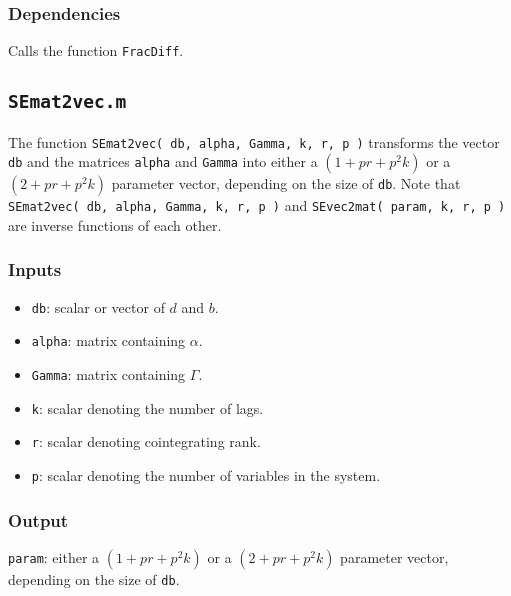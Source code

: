 \documentclass[12pt]{article}
\begin{document}
\subsubsection*{Dependencies}

Calls the function \texttt{FracDiff}.




\newpage


\subsection{\texttt{SEmat2vec.m}}

The function \texttt{SEmat2vec( db, alpha, Gamma, k, r, p )} transforms the vector \texttt{db} and the matrices \texttt{alpha} and \texttt{Gamma} into either a $( 1 + pr + p^2 k )$ or a $( 2 + pr + p^2 k )$ parameter vector, depending on the size of \texttt{db}. Note that \texttt{SEmat2vec( db, alpha, Gamma, k, r, p )} and \texttt{SEvec2mat( param, k, r, p )} are inverse functions of each other. 


\subsubsection*{Inputs}

\begin{itemize}

\item \texttt{db}: scalar or vector of $d$ and $b$.

\item \texttt{alpha}: matrix containing $\alpha$.

\item \texttt{Gamma}: matrix containing $\Gamma$.

\item \texttt{k}: scalar denoting the number of lags.

\item \texttt{r}: scalar denoting cointegrating rank.

\item \texttt{p}: scalar denoting the number of variables in the system.
 
\end{itemize}


\subsubsection*{Output}

\texttt{param}: either a $( 1 + pr + p^2 k )$ or a $( 2 + pr + p^2 k )$ parameter vector, depending on the size of \texttt{db}. 
\end{document}
